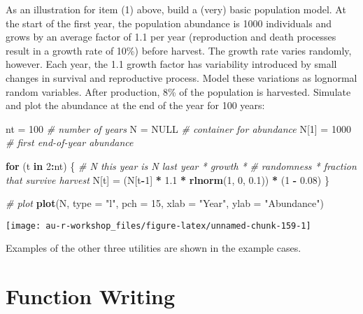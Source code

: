 \documentclass[]{book}
\newenvironment{Shaded}{\begin{snugshade}}{\end{snugshade}}
\newcommand{\KeywordTok}[1]{\textcolor[rgb]{0.13,0.29,0.53}{\textbf{#1}}}
\newcommand{\DataTypeTok}[1]{\textcolor[rgb]{0.13,0.29,0.53}{#1}}
\newcommand{\DecValTok}[1]{\textcolor[rgb]{0.00,0.00,0.81}{#1}}
\newcommand{\FloatTok}[1]{\textcolor[rgb]{0.00,0.00,0.81}{#1}}
\newcommand{\StringTok}[1]{\textcolor[rgb]{0.31,0.60,0.02}{#1}}
\newcommand{\CommentTok}[1]{\textcolor[rgb]{0.56,0.35,0.01}{\textit{#1}}}
\newcommand{\OtherTok}[1]{\textcolor[rgb]{0.56,0.35,0.01}{#1}}
\newcommand{\ControlFlowTok}[1]{\textcolor[rgb]{0.13,0.29,0.53}{\textbf{#1}}}
\newcommand{\OperatorTok}[1]{\textcolor[rgb]{0.81,0.36,0.00}{\textbf{#1}}}
\newcommand{\NormalTok}[1]{#1}
\theoremstyle{definition}
\theoremstyle{definition}
\theoremstyle{definition}
\theoremstyle{remark}
\begin{document}
As an illustration for item (1) above, build a (very) basic population
model. At the start of the first year, the population abundance is 1000
individuals and grows by an average factor of 1.1 per year (reproduction
and death processes result in a growth rate of 10\%) before harvest. The
growth rate varies randomly, however. Each year, the 1.1 growth factor
has variability introduced by small changes in survival and reproductive
process. Model these variations as lognormal random variables. After
production, 8\% of the population is harvested. Simulate and plot the
abundance at the end of the year for 100 years:

\begin{Shaded}
\begin{Highlighting}[]
\NormalTok{nt =}\StringTok{ }\DecValTok{100}        \CommentTok{# number of years}
\NormalTok{N =}\StringTok{ }\OtherTok{NULL}       \CommentTok{# container for abundance}
\NormalTok{N[}\DecValTok{1}\NormalTok{] =}\StringTok{ }\DecValTok{1000}    \CommentTok{# first end-of-year abundance}

\ControlFlowTok{for}\NormalTok{ (t }\ControlFlowTok{in} \DecValTok{2}\OperatorTok{:}\NormalTok{nt) \{}
  \CommentTok{# N this year is N last year * growth *}
    \CommentTok{# randomness * fraction that survive harvest}
\NormalTok{  N[t] =}\StringTok{ }\NormalTok{(N[t}\OperatorTok{-}\DecValTok{1}\NormalTok{] }\OperatorTok{*}\StringTok{ }\FloatTok{1.1} \OperatorTok{*}\StringTok{ }\KeywordTok{rlnorm}\NormalTok{(}\DecValTok{1}\NormalTok{, }\DecValTok{0}\NormalTok{, }\FloatTok{0.1}\NormalTok{)) }\OperatorTok{*}\StringTok{ }\NormalTok{(}\DecValTok{1} \OperatorTok{-}\StringTok{ }\FloatTok{0.08}\NormalTok{)}
\NormalTok{\}}

\CommentTok{# plot}
\KeywordTok{plot}\NormalTok{(N, }\DataTypeTok{type =} \StringTok{"l"}\NormalTok{, }\DataTypeTok{pch =} \DecValTok{15}\NormalTok{, }\DataTypeTok{xlab =} \StringTok{"Year"}\NormalTok{, }\DataTypeTok{ylab =} \StringTok{"Abundance"}\NormalTok{)}
\end{Highlighting}
\end{Shaded}

\begin{center}\texttt{[image: au-r-workshop\_files/figure-latex/unnamed-chunk-159-1]} \end{center}

Examples of the other three utilities are shown in the example cases.

\section{Function Writing}\label{adv-funcs}
\end{document}
